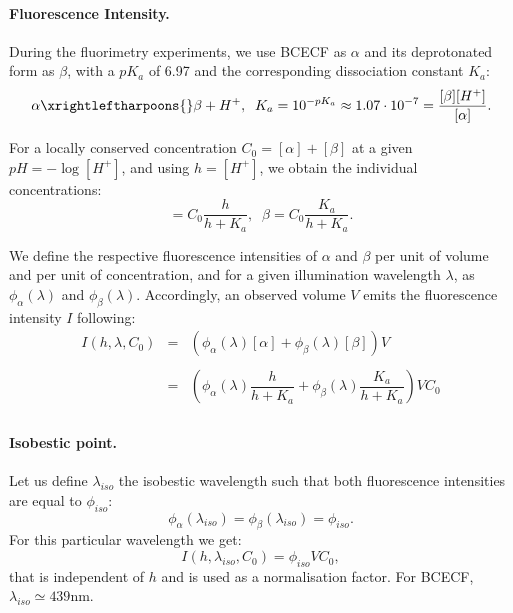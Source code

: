 \documentclass[12pt]{article}
\begin{document}
\paragraph{Fluorescence Intensity.}
\noindent During the fluorimetry experiments, we use BCECF as $\alpha$
and its deprotonated form as $\beta$, with a $pK_a$ of 6.97 and the corresponding
dissociation constant $K_a$:
\begin{equation}
\alpha \xrightleftharpoons{} \beta + H^+, \;\; K_a = 10^{-pK_a} \approx 1.07 \cdot 10^{-7}  = \dfrac{[\beta][H^+]}{[\alpha]}.
\end{equation}

\noindent For a locally conserved concentration $C_0 = [\alpha] + [\beta]$ at a given ${pH=-\log [H^+]}$, and using $h=[H^+]$, we obtain the individual concentrations:
\begin{equation}
	[\alpha] = C_0 \dfrac{h}{h+K_a}, \;\; \beta = C_0 \dfrac{K_a}{h+K_a}.
\end{equation}

\noindent We define the respective fluorescence intensities of $\alpha$ and $\beta$ per unit of volume and per unit of concentration, and for a given illumination wavelength $\lambda$, as $\phi_\alpha(\lambda)$ and $\phi_\beta(\lambda)$.
Accordingly, an observed volume $V$ emits the fluorescence intensity $I$ following:
\begin{equation}
\begin{array}{rcl}
		I(h,\lambda,C_0)  & = & \left( \phi_\alpha(\lambda) [\alpha]  + \phi_\beta(\lambda) [\beta] \right) V\\
		\\
		& = &  \left( \phi_\alpha(\lambda) \dfrac{h}{h+K_a} + \phi_\beta(\lambda) \dfrac{K_a}{h+K_a} \right) V C_0\\
\end{array}
\end{equation}

\paragraph{Isobestic point.}
\noindent Let us define $\lambda_{iso}$ the isobestic wavelength such that both fluorescence intensities are equal to $\phi_{iso}$:
\begin{equation}
\phi_\alpha(\lambda_{iso})=\phi_\beta(\lambda_{iso})=\phi_{iso}.
\end{equation}
For this particular wavelength we get:
\begin{equation}
I(h,\lambda_{iso},C_0) = \phi_{iso}V C_0,
\end{equation}
that is independent of $h$ and is used as a normalisation factor. 
For BCECF, $\lambda_{iso}\simeq439 \mathrm{nm}$.
\end{document}
